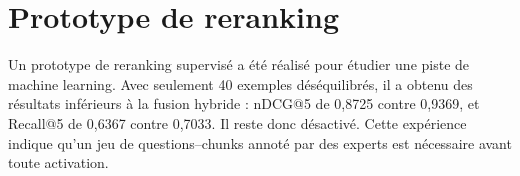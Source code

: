 \section{Prototype de reranking}

Un prototype de reranking supervisé a été réalisé pour étudier une piste de machine learning. Avec seulement 40 exemples déséquilibrés, il a obtenu des résultats inférieurs à la fusion hybride : nDCG@5 de 0,8725 contre 0,9369, et Recall@5 de 0,6367 contre 0,7033. Il reste donc désactivé. Cette expérience indique qu'un jeu de questions--chunks annoté par des experts est nécessaire avant toute activation.

